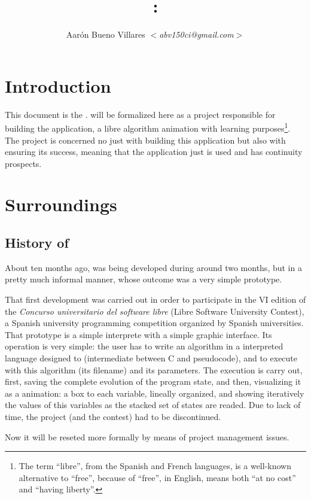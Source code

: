 \documentclass[twocolumn]{article}
\title{\fav: \favc}
\author{Aarón Bueno Villares \textit{$<$abv150ci@gmail.com$>$}}
\begin{document}
\twocolumn[
  \maketitle
]

\tableofcontents

\section{Introduction}
This document is the \favc. \favp will be formalized
here as a project responsible for building the \fav application, a
libre algorithm animation with learning purposes\footnote{The
  term ``libre'', from the Spanish and French languages, is a well-known
  alternative to ``free'', because of ``free'', in English, means both
  ``at no cost'' and ``having liberty''.}. The
project is concerned no just with building this
application but also with ensuring its success, meaning that the
application just is used and has continuity prospects.

\section{Surroundings}
\subsection{History of \fav}
\label{subsec:history}
About ten months ago, \fav was
being developed during around two months, but in a pretty much
informal manner, whose outcome was a very simple prototype.

That first \fav development was carried out in order to participate in the
VI edition of the \textit{Concurso universitario del software libre}
(Libre Software University Contest), a Spanish
university programming competition organized by Spanish
universities. That prototype is a simple interprete with a simple
graphic interface. Its operation is very simple: the user has to write
an algorithm in a interpreted language designed to \fav (intermediate
between C and pseudocode), and to execute \fav with this algorithm
(its filename) and its parameters. The execution is carry out, first,
saving the complete evolution of the program state, and then,
visualizing it as a animation: a box to each variable, lineally
organized, and showing iteratively the values of this variables as the
stacked set of states are readed. Due to lack of time, the
project (and the contest) had to be discontinued.

Now it will be reseted more formally by means of project
management issues.
\end{document}
